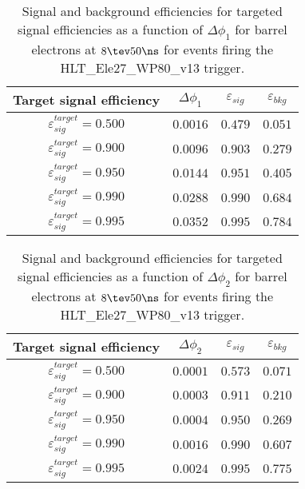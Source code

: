 \clearpage

\begin{table}[!bht]
  \begin{center}
    \begin{tabular}{cccc}
      \hline
      Target signal efficiency & $\Delta\phi_1$ & $\varepsilon_{sig}$ & $\varepsilon_{bkg}$ \\ 
      \hline
      $\varepsilon_{sig}^{target} = 0.500$ & $  0.0016$ & $0.479$ & $0.051$ \\
      $\varepsilon_{sig}^{target} = 0.900$ & $  0.0096$ & $0.903$ & $0.279$ \\
      $\varepsilon_{sig}^{target} = 0.950$ & $  0.0144$ & $0.951$ & $0.405$ \\
      $\varepsilon_{sig}^{target} = 0.990$ & $  0.0288$ & $0.990$ & $0.684$ \\
      $\varepsilon_{sig}^{target} = 0.995$ & $  0.0352$ & $0.995$ & $0.784$ \\
      \hline
    \end{tabular}
    \caption{Signal and background efficiencies for targeted signal efficiencies as a function of $\Delta\phi_1$ for barrel electrons at $8\tev 50\ns$ for events firing the HLT\_Ele27\_WP80\_v13 trigger.}
    \label{tab:eff_rej_phi1_beam_8_50_trigger_27_B}
  \end{center}
\end{table}

\clearpage

\begin{table}[!bht]
  \begin{center}
    \begin{tabular}{cccc}
      \hline
      Target signal efficiency & $\Delta\phi_2$ & $\varepsilon_{sig}$ & $\varepsilon_{bkg}$ \\ 
      \hline
      $\varepsilon_{sig}^{target} = 0.500$ & $  0.0001$ & $0.573$ & $0.071$ \\
      $\varepsilon_{sig}^{target} = 0.900$ & $  0.0003$ & $0.911$ & $0.210$ \\
      $\varepsilon_{sig}^{target} = 0.950$ & $  0.0004$ & $0.950$ & $0.269$ \\
      $\varepsilon_{sig}^{target} = 0.990$ & $  0.0016$ & $0.990$ & $0.607$ \\
      $\varepsilon_{sig}^{target} = 0.995$ & $  0.0024$ & $0.995$ & $0.775$ \\
      \hline
    \end{tabular}
    \caption{Signal and background efficiencies for targeted signal efficiencies as a function of $\Delta\phi_2$ for barrel electrons at $8\tev 50\ns$ for events firing the HLT\_Ele27\_WP80\_v13 trigger.}
    \label{tab:eff_rej_phi2_beam_8_50_trigger_27_B}
  \end{center}
\end{table}


